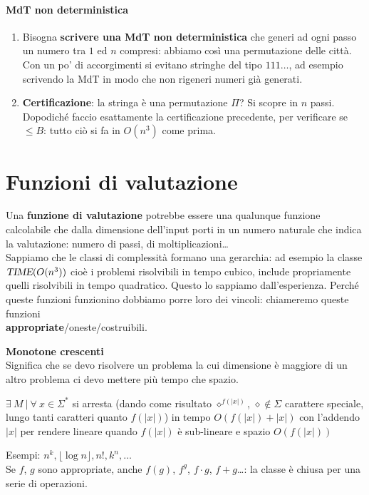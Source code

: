 \documentclass[10pt]{book}
\begin{document}
\paragraph{MdT non deterministica}
\begin{enumerate}
	\item Bisogna \textbf{scrivere una MdT non deterministica} che generi ad ogni passo un numero tra $1$ ed $n$ compresi: abbiamo così una permutazione delle città.\\Con un po' di accorgimenti si evitano stringhe del tipo $111\ldots$, ad esempio scrivendo la MdT in modo che non rigeneri numeri già generati.
	\item \textbf{Certificazione}: la stringa è una permutazione $\Pi$? Si scopre in $n$ passi.\\
	Dopodiché faccio esattamente la certificazione precedente, per verificare se $\leq B$: tutto ciò si fa in $O(n^3)$ come prima.
\end{enumerate}
\section{Funzioni di valutazione}
Una \textbf{funzione di valutazione} potrebbe essere una qualunque funzione calcolabile che dalla dimensione dell'input porti in un numero naturale che indica la valutazione: numero di passi, di moltiplicazioni\ldots\\
Sappiamo che le classi di complessità formano una gerarchia: ad esempio la classe $\textsl{TIME}(O(n^3))$ cioè i problemi risolvibili in tempo cubico, include propriamente quelli risolvibili in tempo quadratico. Questo lo sappiamo dall'esperienza. Perché queste funzioni funzionino dobbiamo porre loro dei vincoli: chiameremo queste funzioni\\\textbf{appropriate}/oneste/costruibili.\\
\begin{list}{}{Vincoli:}
	\item \textbf{Monotone crescenti}\\
	Significa che se devo risolvere un problema la cui dimensione è maggiore di un altro problema ci devo mettere più tempo che spazio.
	\item $\exists\:M\:|\:\forall\:x\in\Sigma^*$ si arresta (dando come risultato $\diamond^{f(|x|)}$, $\diamond \not\in \Sigma$ carattere speciale, lungo tanti caratteri quanto $f(|x|)$) in tempo $O(f(|x|) + |x|)$ con l'addendo $|x|$ per rendere lineare quando $f(|x|)$ è sub-lineare e spazio $O(f(|x|))$
\end{list}
Esempi: $n^k, \lfloor\log n\rfloor, n!, k^n,\ldots$\\
Se $f$, $g$ sono appropriate, anche $f(g)$, $f^g$, $f\cdot g$, $f + g$\ldots: la classe è chiusa per una serie di operazioni.
\end{document}
